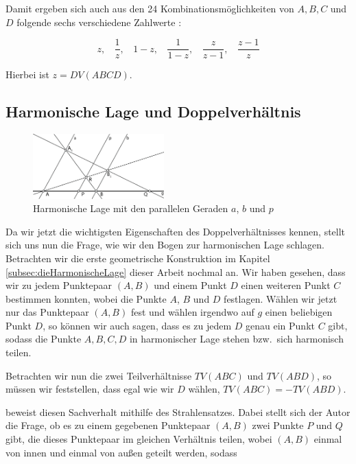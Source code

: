 \documentclass[12pt,a4paper]{article}
\begin{document}
Damit ergeben sich auch aus den 24 Kombinationsmöglichkeiten von $A, B, C$ und $D$ folgende sechs verschiedene Zahlwerte \citep[s.][S.~77f]{projektiveGeometrie}:

\[z, ~~~~\dfrac{1}{z}, ~~~~1-z, ~~~~\dfrac{1}{1-z}, ~~~~\dfrac{z}{z-1}, ~~~~\dfrac{z-1}{z}\]

Hierbei ist $z = DV(A B C D)$.

\subsection{Harmonische Lage und Doppelverhältnis}

\begin{figure}
\hspace{-0.025\textwidth}
\includegraphics[width=0.45\textwidth]{Bilder/doppelverhaeltnis.png}
\caption{Harmonische Lage mit den parallelen Geraden $a$, $b$ und $p$}
\label{fig:harmonDoppel}
\end{figure}

Da wir jetzt die wichtigsten Eigenschaften des Doppelverhältnisses kennen, stellt sich uns nun die Frage, wie wir den Bogen zur harmonischen Lage schlagen. Betrachten wir die erste geometrische Konstruktion im Kapitel \ref{subsec:dieHarmonischeLage} dieser Arbeit nochmal an. Wir haben gesehen, dass wir zu jedem Punktepaar $(A, B)$ und einem Punkt $D$ einen weiteren Punkt $C$ bestimmen konnten, wobei die Punkte $A$, $B$ und $D$ festlagen. Wählen wir jetzt nur das Punktepaar $(A, B)$ fest und wählen irgendwo auf $g$ einen beliebigen Punkt $D$, so können wir auch sagen, dass es zu jedem $D$ genau ein Punkt $C$ gibt, sodass die Punkte $A, B, C, D$ in harmonischer Lage stehen bzw.~sich harmonisch teilen.

Betrachten wir nun die zwei Teilverhältnisse $TV(A B C)$ und $TV(A B D)$, so müssen wir feststellen, dass egal wie wir $D$ wählen, $TV(A B C) = -TV(A B D)$.

\citep{projektiveGeometrie} beweist diesen Sachverhalt mithilfe des Strahlensatzes. Dabei stellt sich der Autor die Frage, ob es zu einem gegebenen Punktepaar $(A, B)$ zwei Punkte $P$ und $Q$ gibt, die dieses Punktepaar im gleichen Verhältnis teilen, wobei $(A,  B)$ einmal von innen und einmal von außen geteilt werden, sodass
\end{document}
